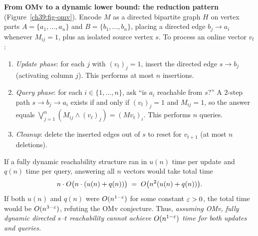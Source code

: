 \begin{whybox}
\textbf{From OMv to a dynamic lower bound: the reduction pattern}
(Figure~\ref{ch39:fig-omv}). Encode $M$ as a directed bipartite graph $H$ on vertex
parts $A=\{a_1,\dots,a_n\}$ and $B=\{b_1,\dots,b_n\}$, placing a directed edge
$b_j \to a_i$ whenever $M_{ij}=1$, plus an isolated source vertex $s$. To process an
online vector $v_t$:
\begin{enumerate}
  \item \emph{Update phase}: for each $j$ with $(v_t)_j=1$, insert the directed edge
        $s \to b_j$ (activating column $j$). This performs at most $n$ insertions.
  \item \emph{Query phase}: for each $i\in\{1,\dots,n\}$, ask ``is $a_i$ reachable from
        $s$?'' A $2$-step path $s \to b_j \to a_i$ exists if and only if $(v_t)_j=1$
        and $M_{ij}=1$, so the answer equals $\bigvee_{j=1}^n (M_{ij}\wedge (v_t)_j) = (Mv_t)_i$.
        This performs $n$ queries.
  \item \emph{Cleanup}: delete the inserted edges out of $s$ to reset for $v_{t+1}$
        (at most $n$ deletions).
\end{enumerate}
If a fully dynamic reachability structure ran in $u(n)$ time per update and $q(n)$ time
per query, answering all $n$ vectors would take total time
\[
  n \cdot O\bigl(n \cdot (u(n) + q(n))\bigr)
  \;=\; O\bigl(n^2 (u(n) + q(n))\bigr).
\]
If both $u(n)$ and $q(n)$ were $O(n^{1-\varepsilon})$ for some constant $\varepsilon>0$, the total
time would be $O(n^{3-\varepsilon})$, refuting the OMv conjecture. Thus, \emph{assuming OMv,
fully dynamic directed $s$--$t$ reachability cannot achieve $O(n^{1-\varepsilon})$ time for
both updates and queries.}
\end{whybox}

